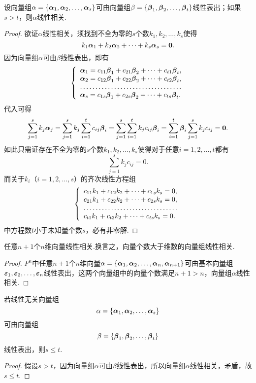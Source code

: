 \begin{theorem}
\def\a#1{\mat{\alpha}_{#1}}
\def\b#1{\mat{\beta}_{#1}}
设向量组\(\alpha=\{ \a1,\a2,\dotsc,\a s \}\)可由向量组\(\beta=\{ \b1,\b2,\dotsc,\b t \}\)线性表出；如果\(s>t\)，则\(\alpha\)线性相关.
\begin{proof}
欲证\(\alpha\)线性相关，须找到不全为零的\(s\)个数\(k_1,k_2,\dots,k_s\)使得\[
k_1 \a1 + k_2 \a2 + \dotsb + k_s \a s = \z.
\]
因为向量组\(\alpha\)可由\(\beta\)线性表出，即有\[
\left\{ \begin{array}{l}
\a1 = c_{11} \b1 + c_{21} \b2 + \dotsb + c_{t1} \b t, \\
\a2 = c_{12} \b1 + c_{22} \b2 + \dotsb + c_{t2} \b t, \\
\hdotsfor{1} \\
\a s = c_{1s} \b1 + c_{2s} \b2 + \dotsb + c_{ts} \b t.
\end{array} \right.
\]代入可得\[
\sum\limits_{j=1}^s{ k_j \a j }
=\sum\limits_{j=1}^s{ k_j \sum\limits_{i=1}^t{c_{ij} \b i} }
=\sum\limits_{j=1}^s{ \sum\limits_{i=1}^t{k_j c_{ij} \b i} }
=\sum\limits_{i=1}^t{ \b i \sum\limits_{j=1}^s{k_j c_{ij}} }
=\z.
\]如此只需证存在不全为零的\(s\)个数\(k_1,k_2,\dots,k_s\)使得对于任意\(i=1,2,\dotsc,t\)都有\[
\sum\limits_{j=1}^s{k_j c_{ij}} = 0.
\]而关于\(k_i\)（\(i=1,2,\dotsc,s\)）的齐次线性方程组\[
\left\{ \begin{array}{l}
c_{11} k_1 + c_{12} k_2 + \dotsb + c_{1s} k_s = 0, \\
c_{21} k_1 + c_{22} k_2 + \dotsb + c_{2s} k_s = 0, \\
\hdotsfor{1} \\
c_{t1} k_1 + c_{t2} k_2 + \dotsb + c_{ts} k_s = 0.
\end{array} \right.
\]中方程数\(t\)小于未知量个数\(s\)，必有非零解.
\end{proof}
\end{theorem}

\begin{corollary}
任意\(n+1\)个\(n\)维向量线性相关.换言之，向量个数大于维数的向量组线性相关.
\begin{proof}
\def\a#1{\mat{\alpha}_{#1}}
\def\e#1{\mat{\varepsilon}_{#1}}
\(P^n\)中任意\(n+1\)个\(n\)维向量\(\alpha = \{ \a1,\a2,\dotsc,\a n,\a{n+1} \}\)可由基本向量组\(\e1,\e2,\dotsc,\e n\)线性表出，这两个向量组中的向量个数满足\(n+1 > n\)，向量组\(\alpha\)线性相关.
\end{proof}
\end{corollary}

\begin{corollary}
若线性无关向量组\[
\alpha=\{\boldsymbol{\alpha}_1,\boldsymbol{\alpha}_2,\dotsc,\boldsymbol{\alpha}_s\}
\]可由向量组\[
\beta=\{\boldsymbol{\beta}_1,\boldsymbol{\beta}_2,\dotsc,\boldsymbol{\beta}_t\}
\]线性表出，则\(s \leqslant t\).
\begin{proof}
假设\(s > t\)，因为向量组\(\alpha\)可由\(\beta\)线性表出，所以向量组\(\alpha\)线性相关，矛盾，故\(s \leqslant t\).
\end{proof}
\end{corollary}

